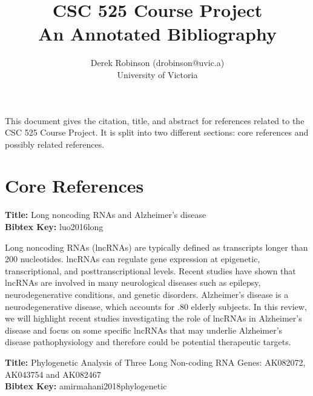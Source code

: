 \documentclass[11pt]{article}
\title{CSC 525 Course Project\\\medskip An Annotated Bibliography}
\author{Derek Robinson (drobinson@uvic.a)\\University of Victoria}
\begin{document}
\maketitle

This document gives the citation, title, and abstract for references related to the CSC 525 Course Project.
It is split into two different sections: core references and possibly related references.

\section{Core References}

\textbf{Title: }Long noncoding RNAs and Alzheimer’s disease\\
\textbf{Bibtex Key: }luo2016long\\
\cite{luo2016long}

Long noncoding RNAs (lncRNAs) are typically defined as transcripts longer than
200 nucleotides. lncRNAs can regulate gene expression at epigenetic, transcriptional, and
posttranscriptional levels. Recent studies have shown that lncRNAs are involved in many
neurological diseases such as epilepsy, neurodegenerative conditions, and genetic disorders.
Alzheimer’s disease is a neurodegenerative disease, which accounts for .80%
elderly subjects. In this review, we will highlight recent studies investigating the role of lncRNAs
in Alzheimer’s disease and focus on some specific lncRNAs that may underlie Alzheimer’s
disease pathophysiology and therefore could be potential therapeutic targets.

\textbf{Title: }Phylogenetic Analysis of Three Long Non-coding RNA Genes: AK082072, AK043754 and AK082467\\
\textbf{Bibtex Key: }amirmahani2018phylogenetic\\
\cite{amirmahani2018phylogenetic}
\end{document}
